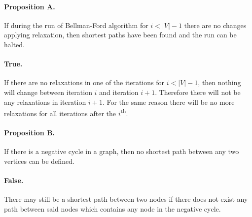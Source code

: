 \documentclass{article}
\begin{document}
\paragraph{Proposition A.} If during the run of Bellman-Ford algorithm for \(i < |V| - 1\) there are no changes applying relaxation, then shortest paths have been found and the run can be halted.

\paragraph{True.} If there are no relaxations in one of the iterations for \(i < |V| - 1\), then nothing will change between iteration \(i\) and iteration \(i+1\). Therefore there will not be any relaxations in iteration \(i+1\). For the same reason there will be no more relaxations for all iterations after the \(i\)\textsuperscript{th}.

\paragraph{Proposition B.} If there is a negative cycle in a graph, then no shortest path between any two vertices can be defined.

\paragraph{False.} There may still be a shortest path between two nodes if there does not exist any path between said nodes which contains any node in the negative cycle.
\end{document}
